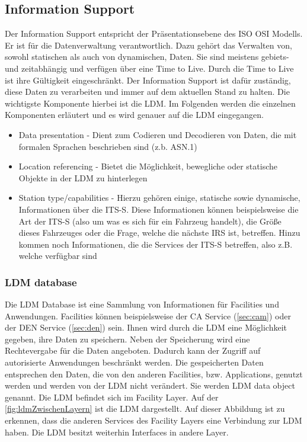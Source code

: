 \subsection{Information Support}
Der Information Support entspricht der Präsentationsebene des \ac{ISO} \ac{OSI} Modells. Er ist für die Datenverwaltung verantwortlich. Dazu gehört das Verwalten von, sowohl statischen als auch von dynamischen, Daten. Sie sind meistens gebiets- und zeitabhängig und verfügen über eine Time to Live. Durch die Time to Live ist ihre Gültigkeit eingeschränkt. Der Information Support ist dafür zuständig, diese Daten zu verarbeiten und immer auf dem aktuellen Stand zu halten. Die wichtigste Komponente hierbei ist die \ac{LDM}. Im Folgenden werden die einzelnen Komponenten erläutert und es wird genauer auf die LDM eingegangen.
\begin{itemize}
	\item Data presentation - Dient zum Codieren und Decodieren von Daten, die mit formalen Sprachen beschrieben sind (z.b. \ac{ASN.1})
	\item Location referencing - Bietet die Möglichkeit, bewegliche oder statische Objekte in der LDM zu hinterlegen 
	\item Station type/capabilities - Hierzu gehören einige, statische sowie dynamische, Informationen über die \ac{ITS-S}. Diese Informationen können beispielsweise die Art der \ac{ITS-S} (also um was es sich für ein Fahrzeug handelt), die Größe dieses Fahrzeuges oder die Frage, welche die nächste \ac{IRS} ist, betreffen. Hinzu kommen noch Informationen, die die Services der \ac{ITS-S} betreffen, also z.B. welche verfügbar sind
\end{itemize}

\subsubsection{LDM database \label{facilitylayer_ldmdatabase}}
Die \ac{LDM} Database ist eine Sammlung von Informationen für Facilities und Anwendungen. Facilities können beispielsweise der \ac{CA} Service (\autoref{sec:cam}) oder der \ac{DEN} Service (\autoref{sec:den}) sein. Ihnen wird durch die \ac{LDM} eine Möglichkeit gegeben, ihre Daten zu speichern. Neben der Speicherung wird eine Rechtevergabe für die Daten angeboten. Dadurch kann der Zugriff auf autorisierte Anwendungen beschränkt werden. Die gespeicherten Daten entsprechen den Daten, die von den anderen Facilities, bzw. Applications, genutzt werden und  werden von der  \ac{LDM} nicht verändert. Sie werden \ac{LDM} data object genannt. 
Die \ac{LDM} befindet sich im Facility Layer. Auf der \autoref{fig:ldmZwischenLayern} ist die \ac{LDM} dargestellt. Auf dieser Abbildung ist zu erkennen, dass die anderen Services des Facility Layers eine Verbindung zur \ac{LDM} haben. Die \ac{LDM} besitzt weiterhin Interfaces in andere Layer.


